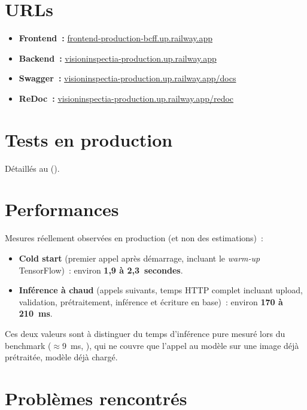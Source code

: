 \section{URLs}
\label{sec:urls}

\begin{itemize}
  \item \textbf{Frontend~:} \href{https://frontend-production-bcff.up.railway.app}{frontend-production-bcff.up.railway.app}
  \item \textbf{Backend~:} \href{https://visioninspectia-production.up.railway.app}{visioninspectia-production.up.railway.app}
  \item \textbf{Swagger~:} \href{https://visioninspectia-production.up.railway.app/docs}{visioninspectia-production.up.railway.app/docs}
  \item \textbf{ReDoc~:} \href{https://visioninspectia-production.up.railway.app/redoc}{visioninspectia-production.up.railway.app/redoc}
\end{itemize}

\section{Tests en production}

D\'etaill\'es au  ().

\section{Performances}

Mesures r\'eellement observ\'ees en production (et non des estimations)~:
\begin{itemize}
  \item \textbf{Cold start} (premier appel apr\`es d\'emarrage, incluant le \emph{warm-up} TensorFlow)~: environ \textbf{1,9 \`a 2,3~secondes}.
  \item \textbf{Inf\'erence \`a chaud} (appels suivants, temps HTTP complet incluant upload, validation, pr\'etraitement, inf\'erence et \'ecriture en base)~: environ \textbf{170 \`a 210~ms}.
\end{itemize}

Ces deux valeurs sont \`a distinguer du temps d'inf\'erence pure mesur\'e lors du benchmark ($\approx$9~ms, ), qui ne couvre que l'appel au mod\`ele sur une image d\'ej\`a pr\'etrait\'ee, mod\`ele d\'ej\`a charg\'e.

\section{Probl\`emes rencontr\'es}
\label{sec:problemes-deploiement}

